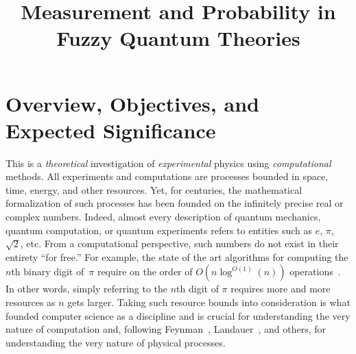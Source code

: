 \documentclass{article}
\title{Measurement and Probability in Fuzzy Quantum Theories}
\date{}
\theoremstyle{remark}
\begin{document}
\maketitle 

\section{Overview, Objectives, and Expected Significance} 

This is a \emph{theoretical} investigation of \emph{experimental}
physics using \emph{computational} methods. All experiments and
computations are processes bounded in space, time, energy, and other
resources. Yet, for centuries, the mathematical formalization of such
processes has been founded on the infinitely precise real or complex
numbers. Indeed, almost every description of quantum mechanics,
quantum computation, or quantum experiments refers to entities such as
$e$, $\pi$, $\sqrt{2}$, etc. From a computational perspective, such
numbers do not exist in their entirety ``for free.''  For example, the
state of the art algorithms for computing the $n$th binary digit of~$\pi$
require on the order of $O(n\log^{O(1)}(n))$
operations~\cite{journals/moc/BaileyBP97}. In other words, simply
referring to the $n$th digit of $\pi$ requires more and more resources
as $n$ gets larger. Taking such resource bounds into consideration is
what founded computer science as a discipline and is crucial for
understanding the very nature of computation and, following
Feynman~\cite{Feynman1982Simulating}, Landauer~\cite{Landauer1996188},
and others, for understanding the very nature of physical processes.
\end{document}
